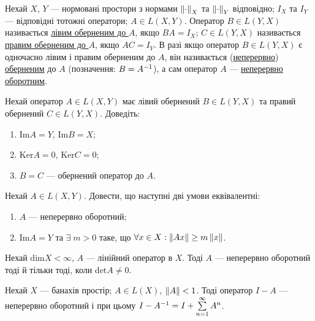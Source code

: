 
\begin{theory}
    Нехай $X$, $Y$ --- нормовані простори з нормами $\left\lVert\cdot\right\rVert_X$ та 
    $\left\lVert\cdot\right\rVert_Y$ відповідно; $I_X$ та $I_Y$ --- відповідні тотожні 
    оператори; $A \in L(X, Y)$. Оператор $B \in L(Y, X)$ називається 
    \ul{лівим оберненим до $A$}, якщо $BA = I_X$; $C \in L(Y, X)$ 
    називається \ul{правим оберненим до $A$}, якщо $AC = I_Y$. В разі якщо оператор 
    $B \in L(Y, X)$ є одночасно лівим і правим оберненим до $A$, він називається 
    (\ul{неперервно}) \ul{оберненим} до $A$ (позначення: $B = A^{-1}$), 
    а сам оператор $A$ --- \ul{неперервно оборотним}.
\end{theory}

\begin{exercise}
    Нехай оператор $A \in L(X, Y)$ має лівий обернений $B \in L(Y, X)$ та правий обернений 
    $C \in L(Y, X)$. Доведіть: 
    \begin{enumerate}
        \item $\mathrm{Im} A = Y$, $\mathrm{Im} B = X$;
        \item $\mathrm{Ker} A = {0}$, $\mathrm{Ker} C = {0}$;
        \item $B = C$ --- обернений оператор до $A$.
    \end{enumerate}
\end{exercise}

\begin{exercise}
    Нехай $A \in L(X, Y)$. Довести, що наступні дві умови еквівалентні:
    \begin{enumerate}
        \item $A$ --- неперервно оборотний;
        \item $\mathrm{Im} A = Y$ та $\exists \; m > 0$ таке, що $\forall x \in X:\left\lVert Ax\right\rVert \geq m \left\lVert x\right\rVert$. 
    \end{enumerate}
\end{exercise}

\begin{exercise}
    Нехай $\mathrm{dim} X < \infty$, $A$ --- лінійний оператор в $X$. Тоді $A$ --- неперервно оборотний 
    тоді й тільки тоді, коли $\mathrm{det} A \neq 0$.
\end{exercise}

\begin{exercise}
    Нехай $X$ --- банахів простір; $A \in L(X)$, $\left\lVert A\right\rVert < 1$. Тоді оператор $I-A$ --- 
    неперервно оборотний і при цьому $I-A^{-1} = I + \sum\limits_{n=1}^\infty A^n$.
\end{exercise}

